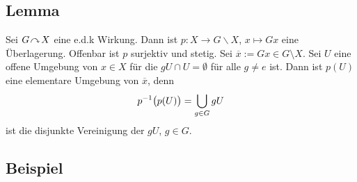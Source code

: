 \subsection[Lemma: edk-Wirkungen definieren Überlagerungen]{Lemma} %
\label{sub:12.2}
Sei $G \wirkung X$ eine e.d.k Wirkung. Dann ist $p : X \to G \backslash X$, $x \mapsto Gx$ eine Überlagerung.
Offenbar ist $p$ surjektiv und stetig. Sei $\overline{x} := G x \in G \setminus X $. Sei $U$ eine offene Umgebung von $x \in X$ für die $g U \cap U = \emptyset$ für alle $g \not= e$ ist. Dann ist $p(U)$ eine elementare Umgebung von $\overline{x}$, denn 
\[
	p ^{-1} \enbrace[\big]{p(U)} = \bigcup_{g \in G} g U
\]
ist die disjunkte Vereinigung der $g U$, $g \in G$. \bewende

\subsection[Beispiele für edk-Wirkungen]{Beispiel} %
\label{sub:12.3}
